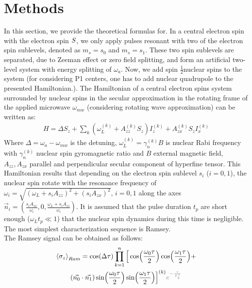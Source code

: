 \documentclass[%
 reprint,
superscriptaddress,
 amsmath,amssymb,
 aps,
]{revtex4-2}
\begin{document}
\section{Methods}
\label{sec:theory}
In this section, we provide the theoretical formulas for. In a central electron spin with the electron spin $\boldmath{S}$, we only apply pulses resonant with two of the electron spin sublevels, denoted as $m_s=s_0$ and $m_s = s_1$. These two spin sublevels are separated, due to Zeeman effect or zero field splitting, and form an artificial two-level system with energy splitting of $\omega_a$. Now, we add spin $\frac{1}{2}$nuclear spins to the system (for considering P1 centers, one has to add nuclear quadrupole to the presented Hamiltonian.). The Hamiltonian of a central electron spins system surrounded by nuclear spins in the secular approximation in the rotating frame of the applied microwave $\omega_{mw}$ (considering rotating wave approximation) can be written as:
\begin{align}
	H = \Delta S_z + \sum_k (\omega_L^{(k)}  + A_{zz}^{(k)} S_z) I_z^{(k)} + A_{zx}^{(k)} S_z I_x^{(k)}
	\label{eq:H}
\end{align}
Where $\Delta = \omega_a - \omega_{mw}$ is the detuning, $\omega_L^{(k)} =\gamma_n^{(k)} B$ is nuclear Rabi frequency with $\gamma_n^{(k)}$ nuclear spin gyromagnetic ratio and $B$ external magnetic field, $A_{zz}, A_{zx}$ parallel and perpendicular secular component of hyperfine tensor. This Hamiltonian results that depending on the electron spin sublevel $s_i$ ($i=0,1$), the nuclear spin rotate with the resonance frequency of $\omega_i = \sqrt{(\omega_L + s_i A_{zz})^2+ (s_i A_{zx})^2}$, $i=0,1$ along the axes $\vec{n}_i =(\frac{s_i A_{zx}}{\omega_i}, 0, \frac{\omega_L + s_i A_{zz}} {\omega_i})$. It is assumed that the pulse duration $t_p$ are short enough ($\omega_L t_p \ll 1$) that the nuclear spin dynamics during this time is negligible. The most simplest characterization sequence is Ramsey. \\ The Ramsey signal can be obtained as follows:
\begin{gather}
	\expval{\sigma_z}_{Ram} = \cos(\Delta \tau) \prod_{k=1}^{n} \Big[ \cos(\frac{\omega_0 \tau}{2}) \cos(\frac{\omega_1 \tau}{2})+ \notag \\
	(\vec{n_0}\cdot \vec{n_1})\sin(\frac{\omega_0 \tau}{2}) \sin(\frac{\omega_1 \tau}{2}) \Big]^{(k)}
	\textcolor{gray}{e^{-\frac{\tau}{T_2^\ast}}}
\end{gather} 
\end{document}
